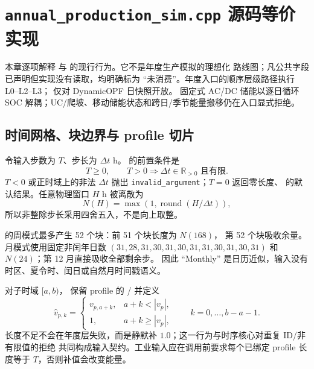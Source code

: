 \section{\texttt{annual\_production\_sim.cpp} 源码等价实现}
\label{sec:annual-source-equivalent}

本章逐项解释
 与
 的现行行为。它不是年度生产模拟的理想化
路线图；凡公共字段已声明但实现没有读取，均明确标为 ``未消费''。年度入口的顺序层级路径执行
L0--L2--L3； 仅对 DynamicOPF 日快照开放。
固定式 AC/DC 储能以逐日循环 SOC 解耦；UC/爬坡、移动储能状态和跨日/季节能量搬移仍在入口显式拒绝。

\subsection{时间网格、块边界与 profile 切片}
令输入步数为 $T$、步长为 $\Delta t$ h。 的前置条件是
\begin{equation}
 T\ge0,\qquad T>0\Longrightarrow \Delta t\in\mathbb R_{>0}\text{ 且有限}.
\end{equation}
$T<0$ 或正时域上的非法 $\Delta t$ 抛出 \texttt{invalid\_argument}；$T=0$ 返回零长度、
 的默认结果。任意物理窗口 $H$ h 被离散为
\begin{equation}
 N(H)=\max\!\left(1,\operatorname{round}(H/\Delta t)\right),
\end{equation}
所以非整除步长采用四舍五入，不是向上取整。

 的周模式最多产生 52 个块：前 51 个块长度为 $N(168)$，
第 52 个块吸收余量。月模式使用固定非闰年日数
$(31,28,31,30,31,30,31,31,30,31,30,31)$ 和 $N(24)$；第 12 月直接吸收全部剩余步。
因此 ``Monthly'' 是日历近似，输入没有时区、夏令时、闰日或自然月时间戳语义。

对子时域 $[a,b)$， 保留 profile 的 / 并定义
\begin{equation}
 \widehat v_{p,k}=\begin{cases}v_{p,a+k},&a+k<|v_p|,\\1,&a+k\ge |v_p|,
 \end{cases}\qquad k=0,\ldots,b-a-1.
\end{equation}
长度不足不会在年度层失败，而是静默补 $1.0$；这一行为与时序核心对重复 ID/非有限值的拒绝
共同构成输入契约。工业输入应在调用前要求每个已绑定 profile 长度等于 $T$，否则补值会改变能量。

